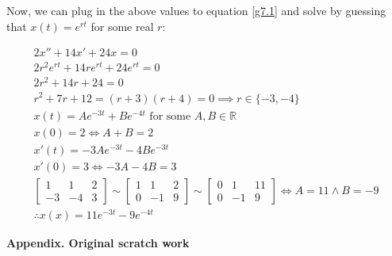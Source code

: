 \documentclass{article}
\newcommand{\reals}{\mathbb{R}}
\begin{document}
Now, we can plug in the above values to equation \ref{g7.1} and solve
by guessing that $x(t) = e^{rt}$ for some real $r$:

\begin{align}
	2x'' + 14x' + 24x = 0 \\
	2r^2e^{rt} + 14re^{rt} + 24e^{rt} = 0 \\
	2r^2+ 14r+ 24 = 0 \\
	r^2+ 7r+ 12 = (r+3)(r+4) = 0 \implies r \in \{ -3, -4 \} \\
	x(t) = Ae^{-3t}+Be^{-4t} \textrm{ for some } A,B \in \reals \\
	x(0) = 2 \iff A+B = 2 \\
	x'(t) = -3Ae^{-3t}-4Be^{-3t} \\
	x'(0) = 3 \iff -3A-4B = 3 \\
	\begin{bmatrix} 1 & 1 & 2 \\ -3 & -4 & 3 \end{bmatrix} \sim
	\begin{bmatrix} 1 & 1 & 2 \\ 0 & -1 & 9 \end{bmatrix} \sim
	\begin{bmatrix} 0 & 1 & 11 \\ 0 & -1 & 9 \end{bmatrix} \iff
	A = 11 \land B = -9 \\
	\therefore x(x) = 11e^{-3t}-9e^{-4t}
\end{align}


\medskip

\textbf{Appendix. Original scratch work}

\medskip
\end{document}
